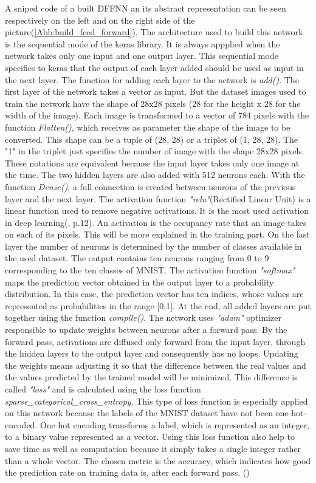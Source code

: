 \noindent
A sniped code of a built DFFNN an its abstract representation can be seen respectively on the left  
and on the right side of the picture(\ref{Abb:build_feed_forward}). 
The architecture used to build this network is the sequential mode of the keras library. 
It is always appplied when the network takes only one input and one output layer. 
This sequential mode specifies to keras that the output of each layer added should be used as input in the next layer. 
The function for adding each layer to the network is \emph{add()}. 
The first layer of the network takes a vector as input. 
But the dataset images used to train the network have the shape of 28x28 pixels (28 for the height x 28 for the width of the image). 
Each image is transformed to a vector of 784 pixels with the function \emph{Flatten()}, which receives as parameter 
the shape of the image to be converted. This shape can be a tuple of (28, 28) or a triplet of (1, 28, 28). 
The "1" in the triplet just specifies the number of image with the shape 28x28 pixels. 
These notations are equivalent because the input layer takes only one image at the time. 
The two hidden layers are also added with 512 neurons each. 
With the function \emph{Dense()}, a full connection is created between neurons of the previous layer and the next layer. 
The activation function \emph{"relu"}(Rectified Linear Unit) is a linear function used to remove negative activations.
It is the most used activation in deep learning(\cite{[1]}, p.12). 
An activation is the occupancy rate that an image takes on each of its pixels. 
This will be more explained in the training part. 
On the last layer the number of neurons is determined by the number of classes available in the used dataset. 
The output contains ten neurons ranging from 0 to 9 corresponding to the ten classes of MNIST. 
The activation function \emph{"softmax"} maps the prediction vector obtained in the output layer to a probability distribution.
In this case, the prediction vector has ten indices, whose values are represented as probabilities in the range [0,1]. 
At the end, all added layers are put together using the function \emph{compile()}. 
The network uses \emph{"adam"} optimizer responsible to update weights between neurons after a forward pass. 
By the forward pass, activations are diffused only forward from the input layer, through the hidden layers to the output 
layer and consequently has no loops.
Updating the weights means adjusting it so that the difference between the real values and the values predicted by 
the trained model will be minimized. 
This difference is called \emph{"loss"} and is calculated using the loss function \emph{sparse\_categorical\_cross\_entropy}. 
This type of loss function is especially applied on this network because the labels of the MNIST dataset have not been one-hot-encoded. 
One hot encoding transforms a label, which is represented as an integer, to a binary value represented as a vector. 
Using this loss function also help to save time as well as computation because it simply takes a single integer rather than a whole vector. 
The chosen metric is the accuracy, which indicates how good the prediction rate on training data is, after each forward pass. (\cite{[4]})

